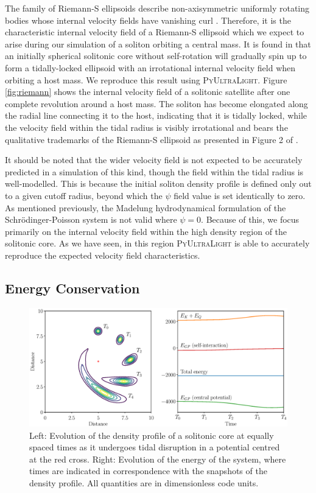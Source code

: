 \documentclass[a4paper,11pt]{article}
\newcommand{\PyUltraLight}{\textsc{PyUltraLight}\xspace}
\begin{document}
The family of Riemann-S ellipsoids describe non-axisymmetric uniformly rotating bodies whose internal velocity fields have vanishing curl \cite{Chandrasekhar1965}. Therefore, it is the characteristic internal velocity field of a Riemann-S ellipsoid which we expect to arise during our simulation of a soliton orbiting a central mass. It is found in \cite{Du2018} that an initially spherical solitonic core without self-rotation will gradually spin up to form a tidally-locked ellipsoid with an irrotational internal velocity field when orbiting a host mass. We reproduce this result using \PyUltraLight. Figure \ref{fig:riemann} shows the internal velocity field of a solitonic satellite after one complete revolution around a host mass. The soliton has become elongated along the radial line connecting it to the host, indicating that it is tidally locked, while the velocity field within the tidal radius is visibly irrotational and bears the qualitative trademarks of the Riemann-S ellipsoid as presented in Figure 2 of \cite{Daller2012}. 

It should be noted that the wider velocity field is not expected to be accurately predicted in a simulation of this kind, though the field within the tidal radius is well-modelled. This is because the initial soliton density profile is defined only out to a given cutoff radius, beyond which the $\psi$ field value is set identically to zero. As mentioned previously, the Madelung hydrodynamical formulation of the Schr{\"o}dinger-Poisson system is not valid where $\psi=0$. Because of this, we focus primarily on the internal velocity field within the high density region of the solitonic core. As we have seen, in this region \PyUltraLight is able to accurately reproduce the expected velocity field characteristics.


\subsection{Energy Conservation}\label{sec:energy}

\begin{figure}
  \includegraphics[width=1.1\textwidth,trim=2.5cm 0 0 1cm,clip]{combined_energy_and_density1}
  \caption{Left: Evolution of the density profile of a solitonic core at equally spaced times as it undergoes tidal disruption in a potential centred at the red cross. Right: Evolution of the energy of the system, where times are indicated in correspondence with the snapshots of the density profile. All quantities are in dimensionless code units.}
  \label{fig:combined_1}
\end{figure}
\end{document}

